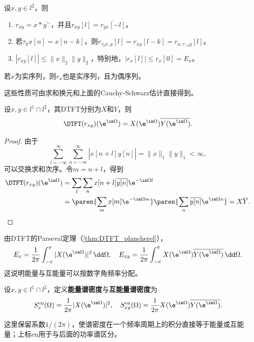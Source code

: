 \begin{proposition}[离散能量信号的相关的性质]
    设$x,y\in l^2$，则
    \begin{enumerate}
        \item $r_{xy}=x*\overline{y^-}$，并且$r_{xy}[l]=\overline{r_{yx}[-l]}$。
        \item 若$\tau_k x[n]=x[n-k]$，则$r_{\tau_k x,y}[l]=r_{xy}[l-k]=r_{x,\tau_{-k}y}[l]$。
        \item $|r_{xy}[l]|\leq\|x\|_2\|y\|_2$，特别地，$|r_x[l]|\leq r_x[0]=E_x$。
    \end{enumerate}
    若$x$为实序列，则$r_x$也是实序列，且为偶序列。
\end{proposition}
这些性质可由求和换元和上面的Cauchy-Schwarz估计直接得到。

\begin{theorem}\label{thm:discrete_energy_wiener_khinchin}
    设$x,y\in l^1\cap l^2$，其DTFT分别为$X$和$Y$，则
    \begin{equation}
        \DTFT(r_{xy})(\e^{\im\Omega})=X(\e^{\im\Omega})\overline{Y(\e^{\im\Omega})}.
    \end{equation}
\end{theorem}
\begin{proof}
    由于
    \begin{equation}
        \sum_{l=-\infty}^{\infty}\sum_{n=-\infty}^{\infty}|x[n+l]\overline{y[n]}|=\|x\|_1\|y\|_1<\infty,
    \end{equation}
    可以交换求和次序。令$m=n+l$，得到
    \begin{align}
        \DTFT(r_{xy})(\e^{\im\Omega})
        &=\sum_l\sum_n x[n+l]\overline{y[n]}\e^{-\im\Omega l} \nonumber \\
        &=\paren{\sum_m x[m]\e^{-\im\Omega m}}\paren{\sum_n\overline{y[n]}\e^{\im\Omega n}}
        =X\overline{Y}.
    \end{align}
\end{proof}

由DTFT的Parseval定理（\cref{thm:DTFT_plancherel}），
\begin{equation}
    E_x=\frac{1}{2\pi}\int_{-\pi}^{\pi}|X(\e^{\im\Omega})|^2\,\dd\Omega,
    \quad
    E_{xy}=\frac{1}{2\pi}\int_{-\pi}^{\pi}X(\e^{\im\Omega})\overline{Y(\e^{\im\Omega})}\,\dd\Omega.
\end{equation}
这说明能量与互能量可以按数字角频率分配。

\begin{definition}[序列的能量谱密度]
    设$x,y\in l^1\cap l^2$，定义\textbf{能量谱密度}与\textbf{互能量谱密度}为
    \begin{equation}
        S_x^{\mathrm{en}}(\Omega)=\frac{1}{2\pi}|X(\e^{\im\Omega})|^2,
        \quad
        S_{xy}^{\mathrm{en}}(\Omega)=\frac{1}{2\pi}X(\e^{\im\Omega})\overline{Y(\e^{\im\Omega})}.
    \end{equation}
\end{definition}
这里保留系数$1/(2\pi)$，使谱密度在一个频率周期上的积分直接等于能量或互能量；上标$\mathrm{en}$用于与后面的功率谱区分。

